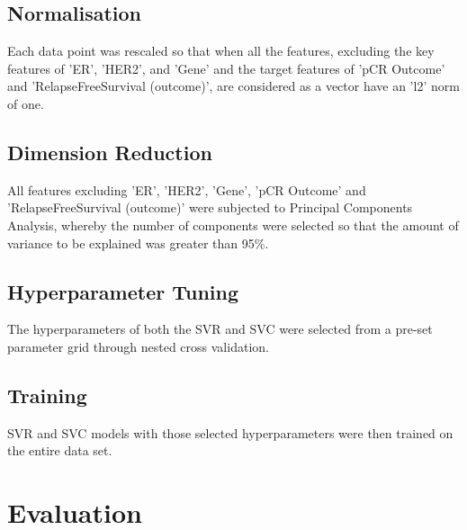\documentclass{article}
\begin{document}
\subsection{Normalisation}
Each data point was rescaled so that when all the features, excluding the key features of 'ER', 'HER2', and 'Gene' and the target features of 'pCR Outcome' and 'RelapseFreeSurvival (outcome)', are considered as a vector have an 'l2' norm of one. 

\subsection{Dimension Reduction}
All features excluding 'ER', 'HER2', 'Gene', 'pCR Outcome' and 'RelapseFreeSurvival (outcome)' were subjected to Principal Components Analysis, whereby the number of components were selected so that the amount of variance to be explained was greater than 95\%.   
\subsection{Hyperparameter Tuning}
The hyperparameters of both the SVR and SVC were selected from a pre-set parameter grid through nested cross validation.
\subsection{Training}
SVR and SVC models with those selected hyperparameters were then trained on the entire data set. 

\section{Evaluation}
\end{document}
